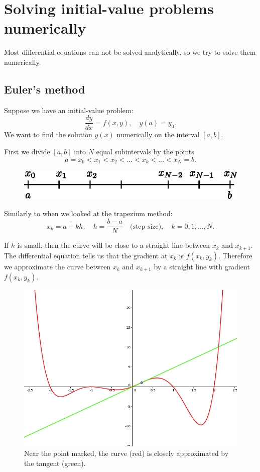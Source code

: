 \section{Solving initial-value problems numerically}
Most differential equations can not be solved analytically, so we try to solve them numerically.

\subsection{Euler's method}
Suppose we have an initial-value problem:
\[\frac{dy}{dx}=f(x,y),\quad y(a)=y_0.\]
We want to find the solution $y(x)$ numerically on the interval $[a,b]$.

First we divide $[a,b]$ into $N$ equal subintervals by the points
\[a=x_0<x_1<x_2<\dots<x_k<\dots<x_N=b.\]

\begin{figure}[H]
\centering
\includegraphics[scale=1.0]{img/subintervals-N}
\end{figure}

Similarly to when we looked at the trapezium method:
\[x_k=a+kh,\quad h=\frac{b-a}{N}\quad \text{(step size)},\quad k=0,1,\dots,N.\]

If $h$ is small, then the curve will be close to a straight line between $x_k$ and $x_{k+1}$.
The differential equation tells us that the gradient at $x_k$ is $f(x_k,y_k)$.
Therefore we approximate the curve between $x_k$ and $x_{k+1}$ by a straight line with gradient $f(x_k,y_k)$.

\begin{figure}[H]
\centering
\includegraphics[width=.8\textwidth]{img/eulermethod}
\caption{Near the point marked, the curve (red) is closely approximated by the tangent (green).}
\end{figure}

